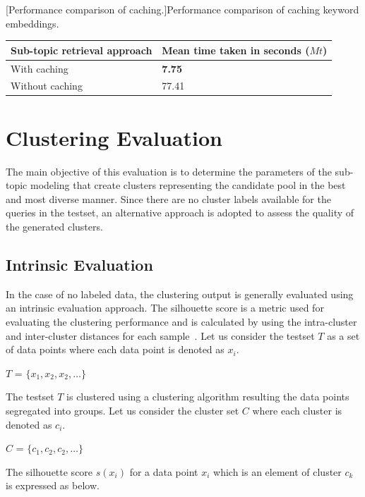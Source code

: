 \begin{center}
	[Performance comparison of caching.]{Performance comparison of caching keyword embeddings.}\label{tab:cache_comparision}
	\begin{tabularx}{0.77\textwidth}{|Y|Y|}
		\hline
		 Sub-topic retrieval approach &  Mean time taken in seconds ($Mt$) \\
		\hline
	 With caching & \textbf{7.75} \\
		\hline
	 Without caching & 77.41 \\
		\hline
	\end{tabularx}
\end{center}


\section{Clustering Evaluation}

The main objective of this evaluation is to determine the parameters of the sub-topic modeling that create clusters representing the candidate pool in the best and most diverse manner. Since there are no cluster labels available for the queries in the testset, an alternative approach is adopted to assess the quality of the generated clusters.

	
	\subsection{Intrinsic Evaluation} In the case of no labeled data, the clustering output is generally evaluated using an intrinsic evaluation approach. The silhouette score is a metric used for evaluating the clustering performance and is calculated by using the intra-cluster and inter-cluster distances for each sample~\cite{rousseeuw1987silhouettes, shutaywi2021silhouette}. Let us consider the testset $T$ as a set of data points where each data point is denoted as $x_i$.
		
		\centerline{$T$ = $\{x_1, x_2, x_2,\dots\}$}
		
		The testset $T$ is clustered using a clustering algorithm resulting the data points segregated into groups. Let us consider the cluster set $C$ where each cluster is denoted as $c_i$.
		
		\centerline{$C$ = $\{c_1, c_2, c_2,\dots\}$}
		
		The silhouette score $s(x_i)$ for a data point $x_i$ which is an element of cluster $c_k$ is expressed as below.\\
		
